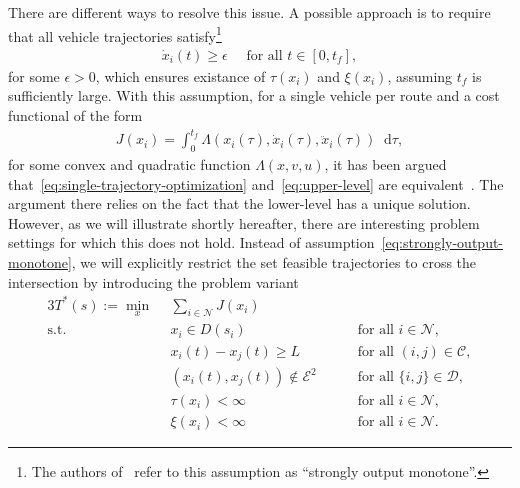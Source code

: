 \documentclass[a4paper]{report}
\theoremstyle{definition}
\theoremstyle{plain}
\newcommand*\diff{\mathop{}\!\mathrm{d}}
\begin{document}
There are different ways to resolve this issue. A possible approach is to
require that all vehicle trajectories satisfy\footnote{The authors
  of~\cite{hultApproximateSolutionOptimal2015} refer to this assumption as ``strongly
  output monotone''.}
\begin{align}\label{eq:strongly-output-monotone}
  \dot{x}_{i}(t) \geq \epsilon \quad \text{ for all } t \in [0, t_{f}] ,
\end{align}
for some $\epsilon > 0$, which ensures
existance of $\tau(x_{i})$ and $\xi(x_{i})$, assuming $t_{f}$ is sufficiently large.
%
With this assumption, for a single vehicle per route and a cost functional of
the form
\begin{align}
  J(x_{i}) = \int_{0}^{t_{f}} \Lambda(x_{i}(\tau), \dot{x}_{i}(\tau), \ddot{x}_{i}(\tau)) \diff \tau ,
\end{align}
for some convex and quadratic function $\Lambda(x,v,u)$, it has been argued that~\eqref{eq:single-trajectory-optimization}
and~\eqref{eq:upper-level} are equivalent~\cite[Theorem 1]{hultTechnicalReportApproximate}.
%
The argument there relies on the fact that the lower-level has a unique
solution. However, as we will illustrate shortly hereafter, there are
interesting problem settings for which this does not hold.
%
Instead of assumption~\eqref{eq:strongly-output-monotone}, we will explicitly restrict the set feasible
trajectories to cross the intersection by introducing the problem variant
\begin{alignat}{3}\label{eq:single-trajectory-optimization-variant}
  T^{*}(s) := \min_{x} \;\, & \sum_{i \in \mathcal{N}} J(x_{i}) \tag{T*} \\
  \text{s.t. } \; & x_{i} \in D(s_{i}) && \quad \text{ for all } i \in \mathcal{N} , \tag{T.1} \\
           & x_{i}(t) - x_{j}(t) \geq L && \quad \text{ for all } (i,j) \in \mathcal{C} , \tag{T.2} \\
           & (x_{i}(t), x_{j}(t)) \notin \mathcal{E}^{2} && \quad\text{ for all } \{i, j\} \in \mathcal{D} , \tag{T.3} \label{eq:T*.3} \\
           & \tau(x_{i}) < \infty && \quad \text{ for all } i \in \mathcal{N} , \tag{T*.4} \label{eq:T4*} \\
           & \xi(x_{i}) < \infty && \quad  \text{ for all } i \in \mathcal{N} . \tag{T*.5} \label{eq:T5*}
\end{alignat}
\end{document}
